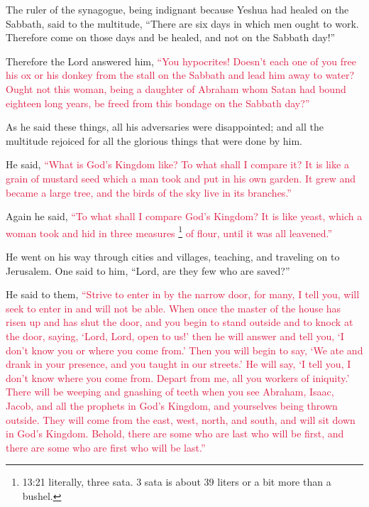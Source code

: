 \myverse{}The ruler of the synagogue, being indignant because Yeshua had
healed on the Sabbath, said to the multitude, “There are six days in which men ought to work. Therefore
come on those days and be healed, and not on the Sabbath day!”

\myverse{}Therefore the Lord answered him,
\textcolor{crimson}{“You hypocrites! Doesn’t each one of you free his ox or his donkey from the stall on the Sabbath and
	lead him away to water?
}
\myverse{}\textcolor{crimson}{Ought not this woman, being a daughter of Abraham whom Satan had bound
	eighteen long years, be freed from this bondage on the Sabbath day?”
}

\myverse{}As he said these things, all his adversaries were disappointed;
and all the multitude rejoiced for all the glorious things that were done by him.

\myverse{}He said,
\textcolor{crimson}{“What is God’s Kingdom like? To what shall I compare it?
}
\myverse{}\textcolor{crimson}{It is like a grain of mustard seed which a man took and put in his own
	garden. It grew and became a large tree, and the birds of the sky live in its branches.”}

\myverse{}Again he said,
\textcolor{crimson}{“To what shall I compare God’s Kingdom?
}
\myverse{}\textcolor{crimson}{It is like yeast, which a woman took and hid in three measures
}\footnote{13:21 literally, three sata. 3 sata is about 39 liters or a bit more than a bushel.}
\textcolor{crimson}{of flour, until it was all leavened.”}

\myverse{}He went on his way through cities and villages, teaching, and
traveling on to Jerusalem.
\myverse{}One said to him, “Lord, are they few who are saved?”

He said to them,
\myverse{}\textcolor{crimson}{“Strive to enter in by the narrow door, for many, I tell you, will seek
	to enter in and will not be able.
}
\myverse{}\textcolor{crimson}{When once the master of the house has risen up and has shut the door,
	and you begin to stand outside and to knock at the door, saying, ‘Lord, Lord, open to us!’ then he will
	answer and tell you, ‘I don’t know you or where you come from.’
}
\myverse{}\textcolor{crimson}{Then you will begin to say, ‘We ate and drank in your presence, and you
	taught in our streets.’
}
\myverse{}\textcolor{crimson}{He will say, ‘I tell you, I don’t know where you come from. Depart from
	me, all you workers of iniquity.’
}
\myverse{}\textcolor{crimson}{There will be weeping and gnashing of teeth when you see Abraham, Isaac,
	Jacob, and all the prophets in God’s Kingdom, and yourselves being thrown outside.
}
\myverse{}\textcolor{crimson}{They will come from the east, west, north, and south, and will sit down
	in God’s Kingdom.
}
\myverse{}\textcolor{crimson}{Behold, there are some who are last who will be first, and there are
	some who are first who will be last.”}

